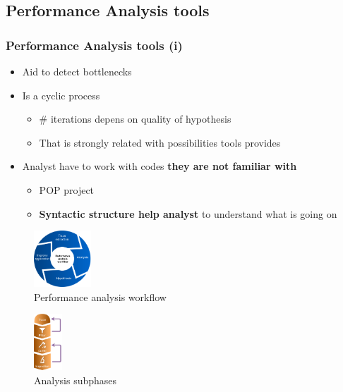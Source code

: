 \documentclass{beamer}
\begin{document}
\subsection{Performance Analysis tools}
\begin{frame}
\frametitle{Performance Analysis tools (i)}
\begin{itemize}
	\item Aid to detect bottlenecks
	\item Is a cyclic process
	\begin{itemize}
		\item \# iterations depens on quality of hypothesis
		\item That is strongly related with possibilities tools provides
	\end{itemize}
	\item Analyst have to work with codes \textbf{they are not familiar with}
	\begin{itemize}
		\item POP project
		\item \textbf{Syntactic structure help analyst} to understand what is going on
	\end{itemize}
\end{itemize}
\begin{multicols}{2}
	\begin{figure}
		\includegraphics[height=80px]{imgs/performance_analysis_diagram.png}
		\caption{Performance analysis workflow}
	\end{figure}
	\columnbreak

	\begin{figure}
		\includegraphics[height=80px]{imgs/analysis_subphases.png}
		\caption{Analysis subphases}
	\end{figure}
\end{multicols}
\end{frame}
\end{document}
